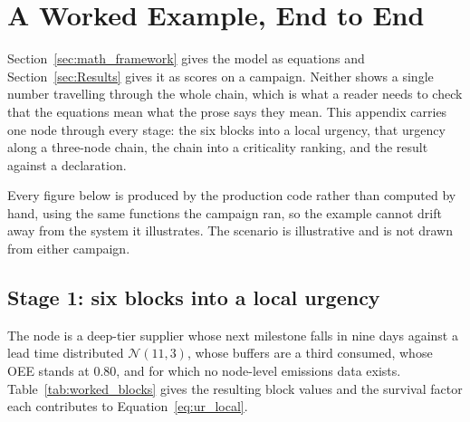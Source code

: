 \section{A Worked Example, End to End}
\label{app:worked}

Section~\ref{sec:math_framework} gives the model as equations and Section~\ref{sec:Results}
gives it as scores on a campaign. Neither shows a single number travelling through the whole
chain, which is what a reader needs to check that the equations mean what the prose
says they mean. This appendix carries one node through every stage: the six blocks into a
local urgency, that urgency along a three-node chain, the chain into a criticality ranking,
and the result against a declaration.

Every figure below is produced by the production code rather than computed by hand, using
the same functions the campaign ran, so the example cannot drift away from the system it
illustrates. The scenario is illustrative and is not drawn from either campaign.

\subsection{Stage 1: six blocks into a local urgency}

The node is a deep-tier supplier whose next milestone falls in nine days against a lead time
distributed $\mathcal{N}(11, 3)$, whose buffers are a third consumed, whose OEE stands at
$0.80$, and for which no node-level emissions data exists. Table~\ref{tab:worked_blocks}
gives the resulting block values and the survival factor each contributes to
Equation~\ref{eq:ur_local}.

